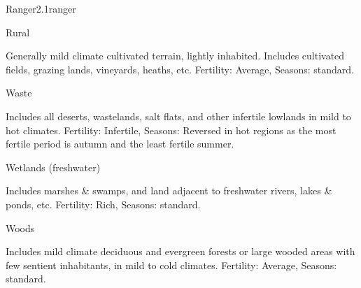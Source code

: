 \begin{skill}{Ranger}{2.1}{ranger}
\begin{Description}
\item[Rural]

Generally mild climate cultivated terrain, lightly inhabited.
Includes cultivated fields, grazing lands, vineyards, heaths, etc.
Fertility: Average, Seasons: standard.

\item[Waste]

Includes all deserts, wastelands, salt flats, and other infertile
lowlands in mild to hot climates.  Fertility: Infertile, Seasons:
Reversed in hot regions as the most fertile period is autumn and the
least fertile summer.

\item[Wetlands (freshwater)]

Includes marshes \& swamps, and land adjacent to freshwater rivers,
lakes \& ponds, etc.  Fertility: Rich, Seasons: standard.

\item[Woods]

Includes mild climate deciduous and evergreen forests or large wooded
areas with few sentient inhabitants, in mild to cold climates.
Fertility: Average, Seasons: standard.
\end{Description}

\begin{table*}

\end{table*}
\end{skill}
